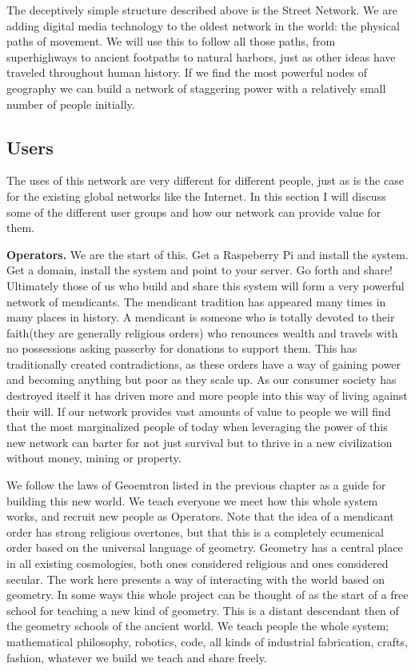 The deceptively simple structure described above is the Street Network.  We are adding digital media technology to the oldest network in the world: the physical paths of movement.  We will use this to follow all those paths, from  superhighways to ancient footpaths to natural harbors, just as other ideas have traveled throughout human history.  If we find the most powerful nodes of geography we can build a network of staggering power with a relatively small number of people initially.


\subsection{Users}

The uses of this network are very different for different people, just as is the case for the existing global networks like the Internet. In this section I will discuss some of the different user groups and how our network can provide value for them.

\textbf{Operators.} We are the start of this.  Get a Raspeberry Pi and install the system. Get a domain, install the system and point to your server.  Go forth and share! Ultimately those of us who build and share this system will form a very powerful network of mendicants.  The mendicant tradition has appeared many times in many places in history.  A mendicant is someone who is totally devoted to their faith(they are generally religious orders) who renounces wealth and travels with no possessions asking passerby for donations to support them.  This has traditionally created contradictions, as these orders have a way of gaining power and becoming anything but poor as they scale up.  As our consumer society has destroyed itself it has driven more and more people into this way of living against their will.  If our network provides vast amounts of value to people we will find that the most marginalized people of today when leveraging the power of this new network can barter for not just survival but to thrive in a new civilization without money, mining or property.  

We follow the laws of Geoemtron listed in the previous chapter as a guide for building this new world.  We teach everyone we meet how this whole system works, and recruit new people as Operators.  Note that the idea of a mendicant order has strong religious overtones, but that this is a completely ecumenical order based on the universal language of geometry.  Geometry has a central place in all existing cosmologies, both ones considered religious and ones considered secular.  The work here presents a way of interacting with the world based on geometry.  In some ways this whole project can be thought of as the start of a free school for teaching a new kind of geometry.  This is a distant descendant then of the geometry schools of the ancient world.  We teach people the whole system; mathematical philosophy, robotics, code, all kinds of industrial fabrication, crafts, fashion, whatever we build we teach and share freely.  

